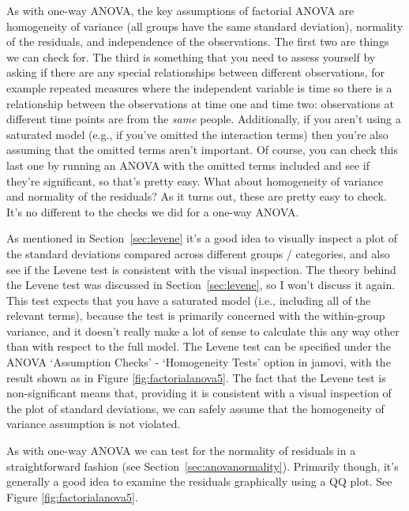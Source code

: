 As with one-way ANOVA, the key assumptions of factorial ANOVA are homogeneity of variance (all groups have the same standard deviation), normality of the residuals, and independence of the observations. The first two are things we can check for. The third is something that you need to assess yourself by asking if there are any special relationships between different observations, for example repeated measures where the independent variable is time so there is a relationship between the observations at time one and time two: observations at different time points are from the {\it same} people. Additionally, if you aren't using a saturated model (e.g., if you've omitted the interaction terms) then you're also assuming that the omitted terms aren't important. Of course, you can check this last one by running an ANOVA with the omitted terms included and see if they're significant, so that's pretty easy. What about homogeneity of variance and normality of the residuals? As it turns out, these are pretty easy to check. It's no different to the checks we did for a one-way ANOVA.


As mentioned in Section~\ref{sec:levene} it's a good idea to visually inspect a plot of the standard deviations compared across different groups / categories, and also see if the Levene test is consistent with the visual inspection. The theory behind the Levene test was discussed in Section~\ref{sec:levene}, so I won't discuss it again. This test expects that you have a saturated model (i.e., including all of the relevant terms), because the test is primarily concerned with the within-group variance, and it doesn't really make a lot of sense to calculate this any way other than with respect to the full model. The Levene test can be specified under the ANOVA `Assumption Checks' - `Homogeneity Tests' option in jamovi, with the result shown as in Figure \ref{fig:factorialanova5}.  The fact that the Levene test is non-significant means that, providing it is consistent with a visual inspection of the plot of standard deviations, we can safely assume that the homogeneity of variance assumption is not violated.


As with one-way ANOVA we can test for the normality of residuals in a straightforward fashion (see Section~\ref{sec:anovanormality}). Primarily though, it's generally a good idea to examine the residuals graphically using a QQ plot. See Figure \ref{fig:factorialanova5}. 

